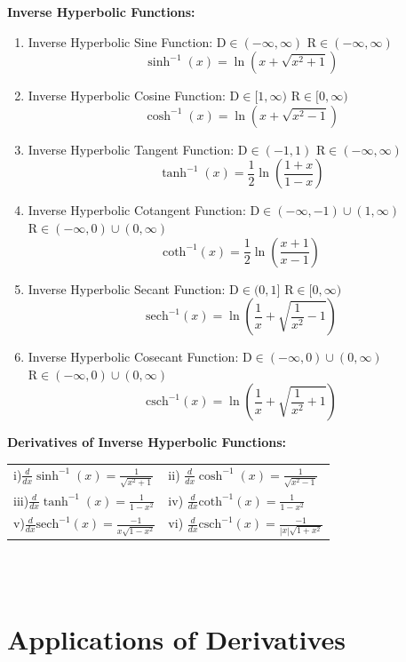 \documentclass[14pt]{article}
\begin{document}
    \textbf{Inverse Hyperbolic Functions:}\\
    \begin{enumerate}
        \item Inverse Hyperbolic Sine Function: $\mathrm{D}\in(-\infty, \infty)$ $\mathrm{R}\in(-\infty, \infty)$
        $$\sinh^{-1}(x)=\ln(x+\sqrt{x^2+1}) $$
        \item Inverse Hyperbolic Cosine Function: $\mathrm{D}\in[1, \infty)$ $\mathrm{R}\in[0, \infty)$
        $$\cosh^{-1}(x)=\ln(x+\sqrt{x^2-1})$$
        \item Inverse Hyperbolic Tangent Function: $\mathrm{D}\in(-1, 1)$ $\mathrm{R}\in(-\infty, \infty)$
        $$\tanh^{-1}(x)=\frac{1}{2}\ln\left(\frac{1+x}{1-x}\right)$$
        \item Inverse Hyperbolic Cotangent Function: $\mathrm{D}\in(-\infty, -1)\cup(1, \infty) $ $\mathrm{R}\in(-\infty,0)\cup(0, \infty)$
        $$\mathrm{coth}^{-1}(x)=\frac{1}{2}\ln\left(\frac{x+1}{x-1}\right)$$
        \item Inverse Hyperbolic Secant Function: $\mathrm{D}\in(0, 1]$ $\mathrm{R}\in[0, \infty)$
        $$\mathrm{sech}^{-1}(x)=\ln\left(\frac{1}{x}+\sqrt{\frac{1}{x^2}-1}\right)$$
        \item Inverse Hyperbolic Cosecant Function: $\mathrm{D}\in(-\infty,0)\cup(0, \infty)$ $\mathrm{R}\in(-\infty,0)\cup(0, \infty)$
        $$\mathrm{csch}^{-1}(x)=\ln\left(\frac{1}{x}+\sqrt{\frac{1}{x^2}+1}\right)$$
    \end{enumerate}
    \textbf{Derivatives of Inverse Hyperbolic Functions:}\\
    \begin{tabular}{p{5cm}p{5cm}}
        i)$\frac{d}{dx}\sinh^{-1}(x)=\frac{1}{\sqrt{x^2+1}}$ & 
        ii) $\frac{d}{dx}\cosh^{-1}(x)=\frac{1}{\sqrt{x^2-1}}$\\
        iii)$\frac{d}{dx}\tanh^{-1}(x)=\frac{1}{1-x^2}$ & 
        iv) $\frac{d}{dx}\mathrm{coth}^{-1}(x)=\frac{1}{1-x^2}$\\
        v)$\frac{d}{dx}\mathrm{sech}^{-1}(x)=\frac{-1}{x\sqrt{1-x^2}}$ & 
        vi) $\frac{d}{dx}\mathrm{csch}^{-1}(x)=\frac{-1}{|x|\sqrt{1+x^2}}$\\
    \end{tabular}\\\\
    \section{Applications of Derivatives}
\end{document}
